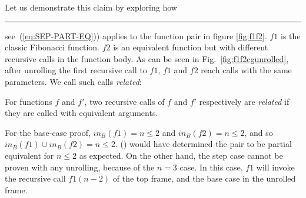 Let us demonstrate this claim by exploring how \rule{SEP-PART-EQ} (see~(\ref{eq:SEP-PART-EQ})) applies to the function pair in figure \ref{fig:f1f2}.
$f1$ is the classic Fibonacci function. $f2$ is an equivalent function but with different recursive calls in the function body. As can be seen in Fig.~\ref{fig:f1f2cgunrolled}, after unrolling the first recursive call to $f1$, $f1$ and $f2$ reach calls with the same parameters. We call such calls \emph{related}: 
\begin{definition}
	\label{def:relatedcalls}
	For functions $f$ and $f'$, two recursive calls of $f$ and $f'$ respectively are \emph{related} if they are called with equivalent arguments.  
\end{definition}
 For the base-case proof, $in_B(f1) = {n \leq 2}$ and $in_B(f2) = {n \leq 2}$, and so $in_B(f1) \cup in_B(f2) = {n \leq 2}$. () would have determined the pair to be partial equivalent for ${n \leq 2}$ as expected. On the other hand, the step case cannot be proven with any unrolling, because of the $n=3$ case. In this case, $f1$ will invoke the recursive call $f1(n-2)$ of the top frame, and the base case in the unrolled frame. 

